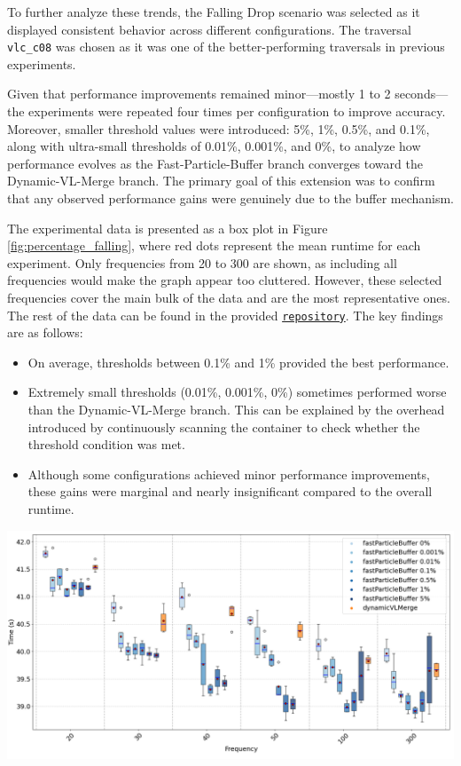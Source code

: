 To further analyze these trends, the Falling Drop scenario was selected as it displayed consistent behavior across different configurations. The traversal \texttt{vlc\_c08} was chosen as it was one of the better-performing traversals in previous experiments.


Given that performance improvements remained minor—mostly 1 to 2 seconds—the experiments were repeated four times per configuration to improve accuracy. Moreover, smaller threshold values were introduced:  
5\%, 1\%, 0.5\%, and 0.1\%, along with ultra-small thresholds of 0.01\%, 0.001\%, and 0\%, to analyze how performance evolves as the Fast-Particle-Buffer branch converges toward the Dynamic-VL-Merge branch. The primary goal of this extension was to confirm that any observed performance gains were genuinely due to the buffer mechanism.


The experimental data is presented as a box plot in Figure \ref{fig:percentage_falling}, where red dots represent the mean runtime for each experiment. Only frequencies from 20 to 300 are shown, as including all frequencies would make the graph appear too cluttered. However, these selected frequencies cover the main bulk of the data and are the most representative ones. The rest of the data can be found in the provided \href{https://github.com/xhulia028/GraphView}{\texttt{repository}}. The key findings are as follows:

\begin{itemize}
    \item On average, thresholds between 0.1\% and 1\% provided the best performance.
    \item Extremely small thresholds (0.01\%, 0.001\%, 0\%) sometimes performed worse than the Dynamic-VL-Merge branch. This can be explained by the overhead introduced by continuously scanning the container to check whether the threshold condition was met.
    \item Although some configurations achieved minor performance improvements, these gains were marginal and nearly insignificant compared to the overall runtime.
\end{itemize}



\begin{center}
    \includegraphics[width=\linewidth]{graphs/percentage_vlcc08.png}
    \label{fig:percentage_falling}
\end{center}



